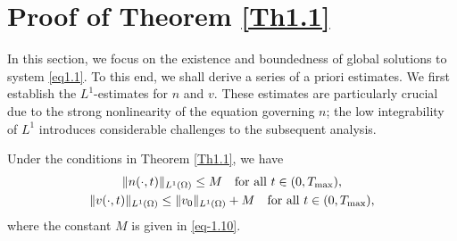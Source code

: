 \documentclass[reqno]{amsart}
\begin{document}
\section{Proof of Theorem \ref{Th1.1}}

In this section, we focus on the existence and boundedness of global  solutions 
to system \eqref{eq1.1}. To this end, we shall derive a series of a priori estimates.
We first establish the \(L^1\)-estimates for \(n\) and \(v\). These estimates are 
particularly crucial due to the strong nonlinearity of the equation governing \(n\); 
the low integrability of \(L^1\) introduces considerable challenges to the subsequent 
analysis.

\begin{lemma}\label{lem3.1}
Under the conditions in Theorem \ref{Th1.1}, we have
\begin{gather}\label{10.20-3}
\|n(\cdot,t)\|_{L^1(\Omega)} \leq M \quad \text{for all } t \in (0, T_{\rm max}), \\
\label{eq-3.2}
\|v(\cdot,t)\|_{L^1(\Omega)} \leq \|v_0\|_{L^1(\Omega)}+M  
\quad \text{for all } t \in (0, T_{\rm max}),
\end{gather}
where the constant $M$ is given in \eqref{eq-1.10}.
\end{lemma}
\end{document}

